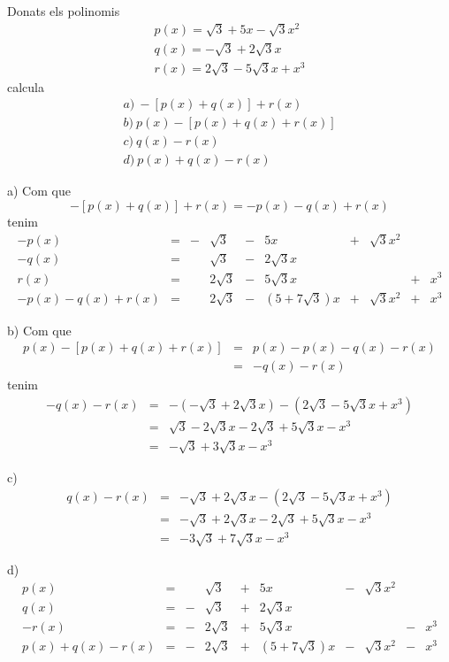 \begin{exercici}
Donats els polinomis\[
\begin{array}{l}
p(x)=\sqrt{3}+5x-\sqrt{3}x^{2} \\
q(x)=-\sqrt{3}+2\sqrt{3}x \\
r(x)=2\sqrt{3}-5\sqrt{3}x+x^{3}\end{array}\]calcula\[
\begin{array}{l}
a)~-\left[ p(x)+q(x)\right] +r(x) \\
b)~p(x)-\left[ p(x)+q(x)+r(x)\right] \\
c)~q(x)-r(x) \\
d)~p(x)+q(x)-r(x)\end{array}\]
\end{exercici}

\begin{solucio}
a) Com que\[
-\left[ p(x)+q(x)\right] +r(x)=-p(x)-q(x)+r(x)
\]tenim\[
\begin{array}{rccccccccc}
-p(x) & = & - & \sqrt{3} & - & 5x & + & \sqrt{3}x^{2} & & \\
-q(x) & = & & \sqrt{3} & - & 2\sqrt{3}x & & & & \\
r(x) & = & & 2\sqrt{3} & - & 5\sqrt{3}x & & & + & x^{3} \\ \hline
-p(x)-q(x)+r(x) & = & & 2\sqrt{3} & - & (5+7\sqrt{3})x & + & \sqrt{3}x^{2}
& + & x^{3}\end{array}\]

b) Com que\begin{eqnarray*}
p(x)-\left[ p(x)+q(x)+r(x)\right] &=&p(x)-p(x)-q(x)-r(x) \\
&=&-q(x)-r(x)
\end{eqnarray*}tenim\begin{eqnarray*}
-q(x)-r(x) &=&-\left( -\sqrt{3}+2\sqrt{3}x\right) -\left( 2\sqrt{3}-5\sqrt{3}x+x^{3}\right) \\
&=&\sqrt{3}-2\sqrt{3}x-2\sqrt{3}+5\sqrt{3}x-x^{3} \\
&=&-\sqrt{3}+3\sqrt{3}x-x^{3}
\end{eqnarray*}

c)\begin{eqnarray*}
q(x)-r(x) &=&-\sqrt{3}+2\sqrt{3}x-\left( 2\sqrt{3}-5\sqrt{3}x+x^{3}\right) \\
&=&-\sqrt{3}+2\sqrt{3}x-2\sqrt{3}+5\sqrt{3}x-x^{3} \\
&=&-3\sqrt{3}+7\sqrt{3}x-x^{3}
\end{eqnarray*}

d)
\[
\begin{array}{rccccccccc}
p(x) & = & & \sqrt{3} & + & 5x & - & \sqrt{3}x^{2} & & \\
q(x) & = & - & \sqrt{3} & + & 2\sqrt{3}x & & & & \\
-r(x) & = & - & 2\sqrt{3} & + & 5\sqrt{3}x & & & - & x^{3} \\ \hline
p(x)+q(x)-r(x) & = & - & 2\sqrt{3} & + & (5+7\sqrt{3})x & - & \sqrt{3}x^{2}
& - & x^{3}\end{array}\]
\end{solucio}

